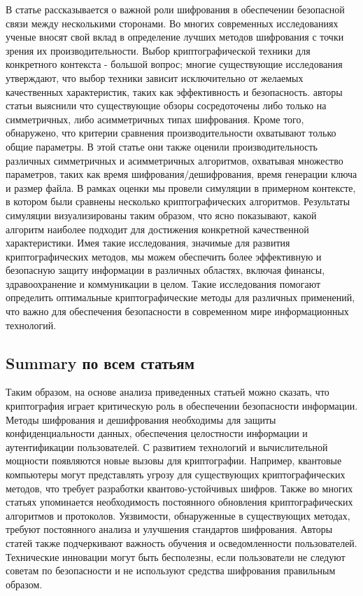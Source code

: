 \documentclass[14pt]{extarticle}
\begin{document}
В статье рассказывается о важной роли шифрования в обеспечении безопасной связи между несколькими сторонами. Во многих современных исследованиях ученые вносят свой вклад в определение лучших методов шифрования с точки зрения их производительности. Выбор криптографической техники для конкретного контекста - большой вопрос; многие существующие исследования утверждают, что выбор техники зависит исключительно от желаемых качественных характеристик, таких как эффективность и безопасность. авторы статьи выяснили что существующие обзоры сосредоточены либо только на симметричных, либо асимметричных типах шифрования. Кроме того, обнаружено, что критерии сравнения производительности охватывают только общие параметры. В этой статье они также оценили производительность различных симметричных и асимметричных алгоритмов, охватывая множество параметров, таких как время шифрования/дешифрования, время генерации ключа и размер файла. В рамках оценки мы провели симуляции в примерном контексте, в котором были сравнены несколько криптографических алгоритмов. Результаты симуляции визуализированы таким образом, что ясно показывают, какой алгоритм наиболее подходит для достижения конкретной качественной характеристики.
Имея такие исследования, значимые для развития криптографических методов, мы можем обеспечить более эффективную и безопасную защиту информации в различных областях, включая финансы, здравоохранение и коммуникации в целом. Такие исследования помогают определить оптимальные криптографические методы для различных применений, что важно для обеспечения безопасности в современном мире информационных технологий.




\subsection{Summary по всем статьям}
Таким образом, на основе анализа приведенных статьей можно сказать, что криптография играет критическую роль в обеспечении безопасности информации. Методы шифрования и дешифрования необходимы для защиты конфиденциальности данных, обеспечения целостности информации и аутентификации пользователей.
С развитием технологий и вычислительной мощности появляются новые вызовы для криптографии. Например, квантовые компьютеры могут представлять угрозу для существующих криптографических методов, что требует разработки квантово-устойчивых шифров. Также во многих статьях упоминается необходимость постоянного обновления криптографических алгоритмов и протоколов. Уязвимости, обнаруженные в существующих методах, требуют постоянного анализа и улучшения стандартов шифрования. Авторы статей также подчеркивают важность обучения и осведомленности пользователей. Технические инновации могут быть бесполезны, если пользователи не следуют советам по безопасности и не используют средства шифрования правильным образом.
\end{document}
